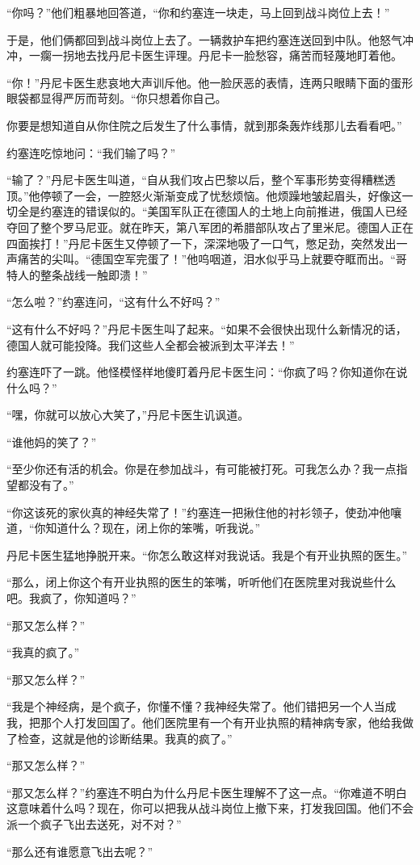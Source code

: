     “你吗？”他们粗暴地回答道，“你和约塞连一块走，马上回到战斗岗位上去！”

    于是，他们俩都回到战斗岗位上去了。一辆救护车把约塞连送回到中队。他怒气冲冲，一瘸一拐地去找丹尼卡医生评理。丹尼卡一脸愁容，痛苦而轻蔑地盯着他。

    “你！”丹尼卡医生悲哀地大声训斥他。他一脸厌恶的表情，连两只眼睛下面的蛋形眼袋都显得严厉而苛刻。“你只想着你自己。

    你要是想知道自从你住院之后发生了什么事情，就到那条轰炸线那儿去看看吧。”

    约塞连吃惊地问：“我们输了吗？”

    “输了？”丹尼卡医生叫道，“自从我们攻占巴黎以后，整个军事形势变得糟糕透顶。”他停顿了一会，一腔怒火渐渐变成了忧愁烦恼。他烦躁地皱起眉头，好像这一切全是约塞连的错误似的。“美国军队正在德国人的土地上向前推进，俄国人已经夺回了整个罗马尼亚。就在昨天，第八军团的希腊部队攻占了里米尼。德国人正在四面挨打！”丹尼卡医生又停顿了一下，深深地吸了一口气，憋足劲，突然发出一声痛苦的尖叫。“德国空军完蛋了！”他呜咽道，泪水似乎马上就要夺眶而出。“哥特人的整条战线一触即溃！”

    “怎么啦？”约塞连问，“这有什么不好吗？”

    “这有什么不好吗？”丹尼卡医生叫了起来。“如果不会很快出现什么新情况的话，德国人就可能投降。我们这些人全都会被派到太平洋去！”

    约塞连吓了一跳。他怪模怪样地傻盯着丹尼卡医生问：“你疯了吗？你知道你在说什么吗？”

    “嘿，你就可以放心大笑了，”丹尼卡医生讥讽道。

    “谁他妈的笑了？”

    “至少你还有活的机会。你是在参加战斗，有可能被打死。可我怎么办？我一点指望都没有了。”

    “你这该死的家伙真的神经失常了！”约塞连一把揪住他的衬衫领子，使劲冲他嚷道，“你知道什么？现在，闭上你的笨嘴，听我说。”

    丹尼卡医生猛地挣脱开来。“你怎么敢这样对我说话。我是个有开业执照的医生。”

    “那么，闭上你这个有开业执照的医生的笨嘴，听听他们在医院里对我说些什么吧。我疯了，你知道吗？”

    “那又怎么样？”

    “我真的疯了。”

    “那又怎么样？”

    “我是个神经病，是个疯子，你懂不懂？我神经失常了。他们错把另一个人当成我，把那个人打发回国了。他们医院里有一个有开业执照的精神病专家，他给我做了检查，这就是他的诊断结果。我真的疯了。”

    “那又怎么样？”

    “那又怎么样？”约塞连不明白为什么丹尼卡医生理解不了这一点。“你难道不明白这意味着什么吗？现在，你可以把我从战斗岗位上撤下来，打发我回国。他们不会派一个疯子飞出去送死，对不对？”

    “那么还有谁愿意飞出去呢？”
